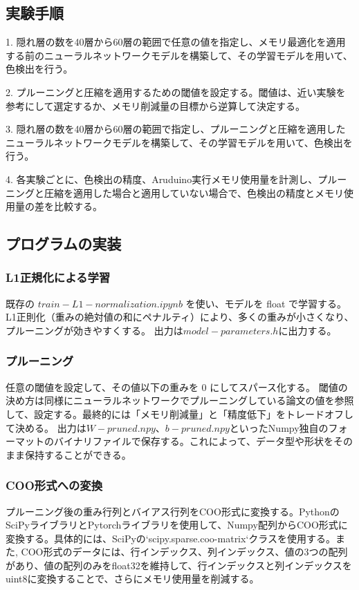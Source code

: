 \documentclass[uplatex,dvipdfmx]{jsarticle}
\begin{document}
\subsection{実験手順}
1. 隠れ層の数を40層から60層の範囲で任意の値を指定し、メモリ最適化を適用する前のニューラルネットワークモデルを構築して、その学習モデルを用いて、色検出を行う。\par
2. プルーニングと圧縮を適用するための閾値を設定する。閾値は、近い実験を参考にして選定するか、メモリ削減量の目標から逆算して決定する。\par
3. 隠れ層の数を40層から60層の範囲で指定し、プルーニングと圧縮を適用したニューラルネットワークモデルを構築して、その学習モデルを用いて、色検出を行う。\par
4. 各実験ごとに、色検出の精度、Aruduino実行メモリ使用量を計測し、プルーニングと圧縮を適用した場合と適用していない場合で、色検出の精度とメモリ使用量の差を比較する。\par
\subsection{プログラムの実装}
\subsubsection{L1正規化による学習}
既存の $train-L1-normalization.ipynb$ を使い、モデルを float で学習する。L1正則化（重みの絶対値の和にペナルティ）により、多くの重みが小さくなり、プルーニングが効きやすくする。
出力は$model-parameters.h$に出力する。
\subsubsection{プルーニング}
任意の閾値を設定して、その値以下の重みを 0 にしてスパース化する。
閾値の決め方は同様にニューラルネットワークでプルーニングしている論文の値を参照して、設定する。最終的には「メモリ削減量」と「精度低下」をトレードオフして決める。
出力は$W-pruned.npy、b-pruned.npy$といったNumpy独自のフォーマットのバイナリファイルで保存する。これによって、データ型や形状をそのまま保持することができる。
\subsubsection{COO形式への変換}
プルーニング後の重み行列とバイアス行列をCOO形式に変換する。PythonのSciPyライブラリとPytorchライブラリを使用して、Numpy配列からCOO形式に変換する。具体的には、SciPyの`scipy.sparse.coo-matrix`クラスを使用する。また,
COO形式のデータには、行インデックス、列インデックス、値の3つの配列があり、値の配列のみをfloat32を維持して、行インデックスと列インデックスをuint8に変換することで、さらにメモリ使用量を削減する。
\end{document}
